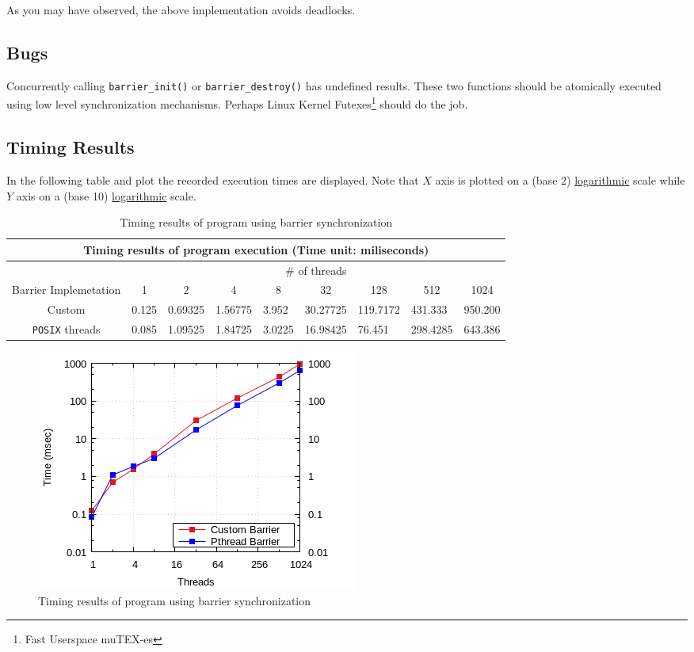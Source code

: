 \documentclass{article}
\def\code#1{\texttt{#1}}
\begin{document}
\hspace{-0.6cm} As you may have observed, the above implementation avoids deadlocks.

\subsection{Bugs}
Concurrently calling \code{barrier\_init()} or \code{barrier\_destroy()} has undefined results.
These two functions should be atomically executed using low level synchronization mechanisms.
Perhaps Linux Kernel Futexes\footnote{Fast Userspace muTEX-es} should do the job.

\newpage 

\subsection{Timing Results}
In the following table and plot the recorded execution times are displayed.
Note that $X$ axis is plotted on a (base 2) \underline{logarithmic} scale while
$Y$ axis on a (base 10) \underline{logarithmic} scale.


\begin{table}[htbp]
  \centering
    \begin{tabular}{|c||l|l|l|l|l|l|l|l|} 
    \hline
    \multicolumn{9}{|c|}{Timing results of program execution (Time unit: miliseconds)} \\
    \hline
    & \multicolumn{8}{|c|}{\# of threads} \\
    \hline
    Barrier Implemetation  & \multicolumn{1}{|c|}{1} & \multicolumn{1}{|c|}{2} & \multicolumn{1}{|c|}{4} &
    \multicolumn{1}{|c|}{8} & \multicolumn{1}{|c|}{32} & \multicolumn{1}{|c|}{128} & \multicolumn{1}{|c|}{512} & 
    \multicolumn{1}{|c|}{1024}\\
    \hline\hline
    Custom & 0.125 & 0.69325 & 1.56775 & 3.952 & 30.27725 & 119.7172 & 431.333 & 950.200 \\
    \hline
    \texttt{POSIX} threads & 0.085 & 1.09525 & 1.84725 & 3.0225 & 16.98425 & 76.451 & 298.4285 & 643.386 \\
    \hline
    \end{tabular}
  \caption{Timing results of program using barrier synchronization}
\end{table}


\begin{figure}[htbp]
  \centering
  \includegraphics[width=0.55\columnwidth]{../../hw1/ex3/plots/barrier.png}
  \caption{Timing results of program using barrier synchronization}
\end{figure}
\end{document}
